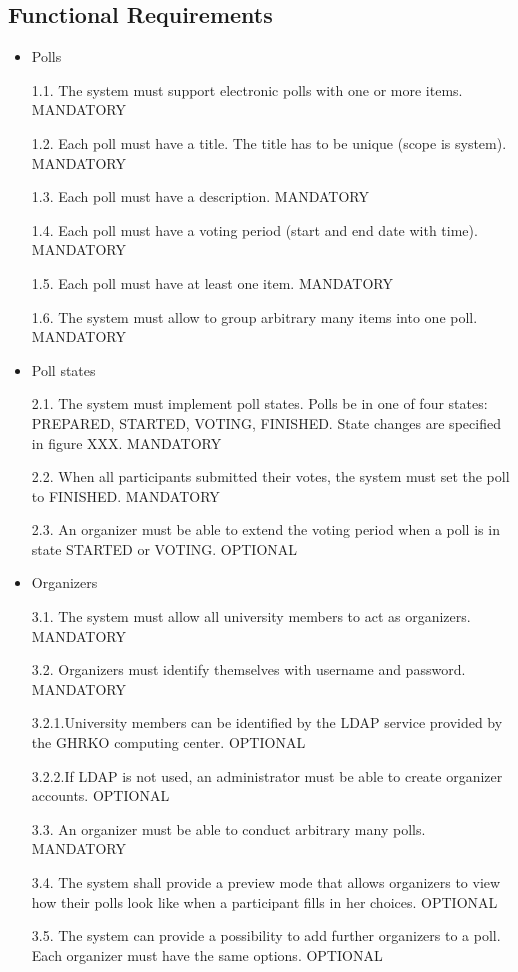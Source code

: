 \subsection{Functional Requirements}
  \begin{itemize}
\item Polls


1.1. The system must support electronic polls with one or more items. MANDATORY


1.2. Each poll must have a title. The title has to be unique (scope is system). MANDATORY


1.3. Each poll must have a description. MANDATORY


1.4. Each poll must have a voting period (start and end date with time). MANDATORY


1.5. Each poll must have at least one item. MANDATORY


1.6. The system must allow to group arbitrary many items into one poll. MANDATORY


\item Poll states


2.1. The system must implement poll states. Polls be in one of four states: PREPARED, STARTED,
VOTING, FINISHED. State changes are specified in figure XXX. MANDATORY


2.2. When all participants submitted their votes, the system must set the poll to FINISHED.
MANDATORY


2.3. An organizer must be able to extend the voting period when a poll is in state STARTED or
VOTING. OPTIONAL


\item Organizers


3.1. The system must allow all university members to act as organizers. MANDATORY


3.2. Organizers must identify themselves with username and password. MANDATORY


3.2.1.University members can be identified by the LDAP service provided by the GHRKO
computing center. OPTIONAL


3.2.2.If LDAP is not used, an administrator must be able to create organizer accounts. OPTIONAL


3.3. An organizer must be able to conduct arbitrary many polls. MANDATORY


3.4. The system shall provide a preview mode that allows organizers to view how their polls look
like when a participant fills in her choices. OPTIONAL


3.5. The system can provide a possibility to add further organizers to a poll. Each organizer must
have the same options. OPTIONAL



\end{itemize}
